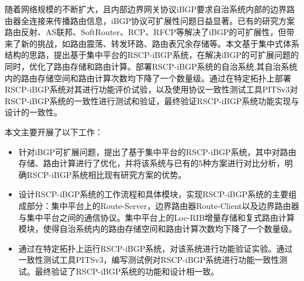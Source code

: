 \begin{cabstract}
  随着网络规模的不断扩大，且内部边界网关协议iBGP要求自治系统内部的边界路由器全连接来传播路由信息，iBGP协议可扩展性问题日益显著。已有的研究方案路由反射、AS联邦、SoftRouter、RCP、RFCP等解决了iBGP的可扩展性，但带来了新的挑战，如路由震荡、转发环路、路由表冗余存储等。本文基于集中式体系结构的思路，提出基于集中平台的RSCP-iBGP系统，在解决iBGP的可扩展问题的同时，优化了路由存储和路由计算。部署RSCP-iBGP系统的自治系统,其自治系统内的路由存储空间和路由计算次数均下降了一个数量级。通过在特定拓扑上部署RSCP-iBGP系统对其进行功能评价试验，以及使用协议一致性测试工具PITSv3对RSCP-iBGP系统的一致性进行测试和验证，最终验证RSCP-iBGP系统功能实现与设计的一致性。

  本文主要开展了以下工作：
  \begin{itemize}
    \item 针对iBGP可扩展问题，提出了基于集中平台的RSCP-iBGP系统，其中对路由存储、路由计算进行了优化，并将该系统与已有的5种方案进行对比分析，明确RSCP-iBGP系统相比现有研究方案的优势。
    \item 设计RSCP-iBGP系统的工作流程和具体模块，实现RSCP-iBGP系统的主要组成部分：集中平台上的Route-Server，边界路由器Route-Client以及边界路由器与集中平台之间的通信协议。集中平台上的Loc-RIB增量存储和复式路由计算模块，使得自治系统内的路由存储空间和路由计算次数均下降了一个数量级。
    \item 通过在特定拓扑上运行RSCP-iBGP系统，对该系统进行功能验证实验。通过一致性测试工具PITSv3，编写测试例对RSCP-iBGP系统进行功能一致性测试。最终验证了RSCP-iBGP系统的功能和设计相一致。
  \end{itemize}

\end{cabstract}


